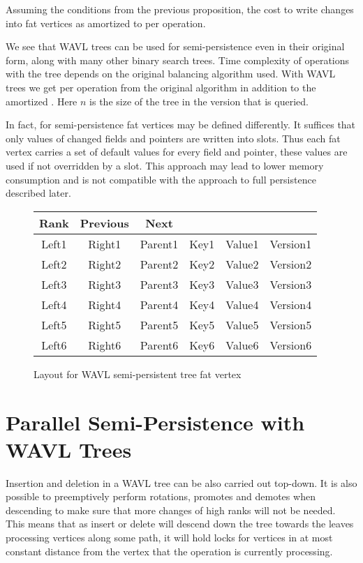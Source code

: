 \begin{obs}
Assuming the conditions from the previous proposition, the cost to write changes into fat vertices as amortized to  per operation.
\end{obs}

We see that WAVL trees can be used for semi-persistence even in their original form, along with many other binary search trees. Time complexity of operations with the tree depends on the original balancing algorithm used. With WAVL trees we get  per operation from the original algorithm in addition to the amortized . Here $n$ is the size of the tree in the version that is queried.

In fact, for semi-persistence fat vertices may be defined differently. It suffices that only values of changed fields and pointers are written into slots. Thus each fat vertex carries a set of default values for every field and pointer, these values are used if not overridden by a slot. This approach may lead to lower memory consumption and is not compatible with the approach to full persistence described later.

\begin{figure}
	\centering
	\ttfamily
	\begin{tabular}{cccccc}
		Rank  & Previous &  Next   &      & &          \\ \hline
		Left1 &  Right1  & Parent1 & Key1 & Value1 &  Version1 \\ \hline
		Left2 &  Right2  & Parent2 & Key2 & Value2 & Version2 \\ \hline
		Left3 &  Right3  & Parent3 & Key3 & Value3 & Version3 \\ \hline
		Left4 &  Right4  & Parent4 & Key4 & Value4 & Version4 \\ \hline
		Left5 &  Right5  & Parent5 & Key5 & Value5 & Version5 \\ \hline
		Left6 &  Right6  & Parent6 & Key6 & Value6 & Version6 \\ \hline
	\end{tabular}
	\normalfont
\caption{Layout for WAVL semi-persistent tree fat vertex}
\end{figure}

\section{Parallel Semi-Persistence with WAVL Trees}

Insertion and deletion in a WAVL tree can be also carried out top-down\cite{rank-balanced-trees}.
It is also possible to preemptively perform rotations, promotes and demotes when descending to make sure that more changes of high ranks will not be needed. This means that as insert or delete will descend down the tree towards the leaves processing vertices along some path, it will hold locks for vertices in at most constant distance from the vertex that the operation is currently processing.

